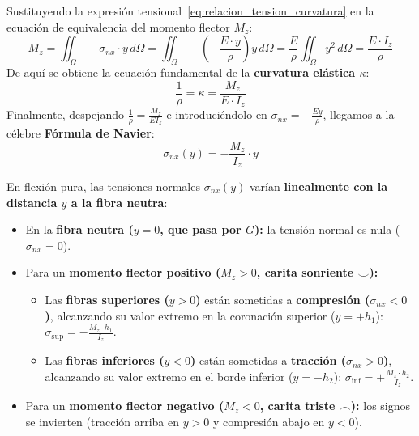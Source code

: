 Sustituyendo la expresión tensional~\eqref{eq:relacion_tension_curvatura} en la ecuación de equivalencia del momento flector $M_z$:
\begin{equation}
    M_z = \iint_{\Omega} -\sigma_{nx} \cdot y \, d\Omega = \iint_{\Omega} -\left(-\frac{E \cdot y}{\rho}\right) y \, d\Omega = \frac{E}{\rho} \iint_{\Omega} y^2 \, d\Omega = \frac{E \cdot I_z}{\rho}
\end{equation}
De aquí se obtiene la ecuación fundamental de la \textbf{curvatura elástica $\kappa$}:
\begin{equation}
    \boxed{\frac{1}{\rho} = \kappa = \frac{M_z}{E \cdot I_z}}
    \label{eq:curvatura_flexion}
\end{equation}
Finalmente, despejando $\frac{1}{\rho} = \frac{M_z}{E I_z}$ e introduciéndolo en $\sigma_{nx} = -\frac{E y}{\rho}$, llegamos a la célebre \textbf{Fórmula de Navier}:
\begin{equation}
    \boxed{\sigma_{nx}(y) = -\frac{M_z}{I_z} \cdot y}
    \label{eq:formula_navier}
\end{equation}

\begin{tcolorbox}[colback=green!5!white, colframe=myg!85!black, title=\textbf{Interpretación Física de la Fórmula de Navier y Distribución Lineal}]
    En flexión pura, las tensiones normales $\sigma_{nx}(y)$ varían \textbf{linealmente con la distancia $y$ a la fibra neutra}:
    \begin{itemize}
        \item En la \textbf{fibra neutra ($y = 0$, que pasa por $G$):} la tensión normal es nula ($\sigma_{nx} = 0$).
        \item Para un \textbf{momento flector positivo ($M_z > 0$, carita sonriente $\smile$):}
              \begin{itemize}
                  \item Las \textbf{fibras superiores ($y > 0$)} están sometidas a \textbf{compresión ($\sigma_{nx} < 0$)}, alcanzando su valor extremo en la coronación superior ($y = +h_1$): $\sigma_{\text{sup}} = -\frac{M_z \cdot h_1}{I_z}$.
                  \item Las \textbf{fibras inferiores ($y < 0$)} están sometidas a \textbf{tracción ($\sigma_{nx} > 0$)}, alcanzando su valor extremo en el borde inferior ($y = -h_2$): $\sigma_{\text{inf}} = +\frac{M_z \cdot h_2}{I_z}$.
              \end{itemize}
        \item Para un \textbf{momento flector negativo ($M_z < 0$, carita triste $\frown$):} los signos se invierten (tracción arriba en $y > 0$ y compresión abajo en $y < 0$).
    \end{itemize}
\end{tcolorbox}

